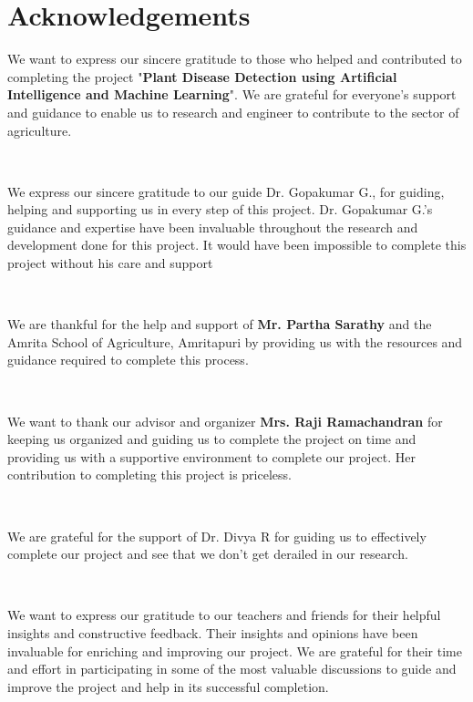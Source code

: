 \documentclass[a4paper, 12pt]{report}
\theoremstyle{definition}
\begin{document}
\newpage
	\clearpage
	\tableofcontents
	
	\chapter*{Acknowledgements}

    
	We want to express our sincere gratitude to those who helped and contributed to completing the project "\textbf{Plant Disease Detection using Artificial Intelligence and Machine Learning}". We are grateful for everyone's support and guidance to enable us to research and engineer to contribute to the sector of agriculture. 
	
	\

    We express our sincere gratitude to our guide Dr. Gopakumar G., for guiding, helping and supporting us in every step of this project. Dr. Gopakumar G.'s guidance and expertise have been invaluable throughout the research and development done for this project. It would have been impossible to complete this project without his care and support 

	\

	We are thankful for the help and support of \textbf{Mr. Partha Sarathy} and the Amrita School of Agriculture, Amritapuri by providing us with the resources and guidance required to complete this process.

	\
	
    We want to thank our advisor and organizer \textbf{Mrs. Raji Ramachandran} for keeping us organized and guiding us to complete the project on time and providing us with a supportive environment to complete our project. Her contribution to completing this project is priceless.

	\
	
    We are grateful for the support of Dr. Divya R for guiding us to effectively complete our project and see that we don't get derailed in our research.

	\
	
    We want to express our gratitude to our teachers and friends for their helpful insights and constructive feedback. Their insights and opinions have been invaluable for enriching and improving our project. We are grateful for their time and effort in participating in some of the most valuable discussions to guide and improve the project and help in its successful completion.
    
\end{document}

